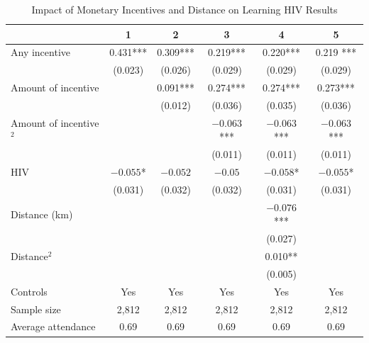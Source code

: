 \documentclass[notes=show]{beamer}
\begin{document}
\begin{frame}[plain]
\begin{table}[htbp]\centering
\scriptsize
\caption{Impact of Monetary Incentives and Distance on Learning HIV Results}
\label{tab:thornton_main}
\centering
\begin{threeparttable}
\begin{tabular}{l*{5}{c}}
\toprule
\multicolumn{1}{l}{\textbf{}}&
\multicolumn{1}{c}{\textbf{1}}&
\multicolumn{1}{c}{\textbf{2}}&
\multicolumn{1}{c}{\textbf{3}}&
\multicolumn{1}{c}{\textbf{4}}&
\multicolumn{1}{c}{\textbf{5}}\\
\midrule
Any incentive&0.431***&0.309***&0.219***&0.220***& 0.219 ***
\\
& (0.023)&(0.026)&(0.029)&(0.029)  & (0.029)
\\
Amount of incentive&&0.091***&0.274***&0.274***& 0.273***
\\
& & (0.012)&(0.036)  & (0.035)  & (0.036)
\\
Amount of incentive$^2$ &&&$-0.063$***&$-0.063$***&$-0.063$***
\\
&& &  (0.011) & (0.011)  & (0.011)
\\
HIV  &$-0.055$* &$-0.052$&$-0.05$&$-0.058$* &$-0.055$*    \\
& (0.031)&(0.032) &(0.032) &  (0.031) & (0.031)
\\
Distance (km) &   &   &   &$-0.076$***&
\\
&          &          &          & (0.027)  &            \\
Distance$^2$   & &  &   & 0.010**  &			
\\
&&		  &			 & (0.005)  &
\\\midrule
Controls&Yes&Yes & Yes   &   Yes 	& Yes		
\\
Sample size& 2,812	& 2,812& 2,812& 2,812& 2,812
\\
Average attendance& 0.69&0.69&0.69&0.69&0.69
\\
\bottomrule
\end{tabular}
\end{threeparttable}
\end{table}

\end{frame}
\end{document}
